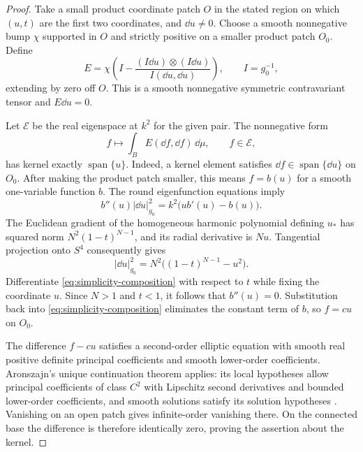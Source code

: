 \begin{proof}
Take a small product coordinate patch $O$ in the stated region on
which $(u,t)$ are the first two coordinates, and $\dd u\ne0$.
Choose a smooth nonnegative bump $\chi$ supported in $O$ and
strictly positive on a smaller product patch $O_0$. Define
\[
 E=\chi\left(I-
 \frac{(I\dd u)\otimes(I\dd u)}{I(\dd u,\dd u)}\right),
 \qquad I=g_0^{-1},
\]
extending by zero off $O$. This is a smooth nonnegative symmetric
contravariant tensor and $E\dd u=0$.

Let $\mathcal E$ be the real eigenspace at $k^2$ for the given
pair. The nonnegative form
\[
 f\longmapsto\int_B E(\dd f,\dd f)\,\dd\mu,
 \qquad f\in\mathcal E,
\]
has kernel exactly $\operatorname{span}\{u\}$. Indeed, a kernel
element satisfies $\dd f\in\operatorname{span}\{\dd u\}$ on
$O_0$. After making the product patch smaller, this means
$f=b(u)$ for a smooth one-variable function $b$. The round
eigenfunction equations imply
\begin{equation}\label{eq:simplicity-composition}
 b''(u)|\dd u|_{g_0}^2=k^2\bigl(ub'(u)-b(u)\bigr).
\end{equation}
The Euclidean gradient of the homogeneous harmonic polynomial
defining $u_*$ has squared norm $N^2(1-t)^{N-1}$, and its radial
derivative is $Nu$. Tangential projection onto $S^4$ consequently
gives
\[
 |\dd u|_{g_0}^2=N^2\bigl((1-t)^{N-1}-u^2\bigr).
\]
Differentiate \eqref{eq:simplicity-composition} with respect to $t$
while fixing the coordinate $u$. Since $N>1$ and $t<1$, it follows
that $b''(u)=0$. Substitution back into
\eqref{eq:simplicity-composition} eliminates the constant term of
$b$, so $f=cu$ on $O_0$.

The difference $f-cu$ satisfies a second-order elliptic equation
with smooth real positive definite principal coefficients and
smooth lower-order coefficients. Aronszajn's unique continuation
theorem applies: its local hypotheses allow principal coefficients
of class $C^2$ with Lipschitz second derivatives and bounded
lower-order coefficients, and smooth solutions satisfy its
solution hypotheses \cite[pp.~235--236]{Aronszajn1957}. Vanishing
on an open patch gives infinite-order vanishing there. On the
connected base the difference is therefore identically zero,
proving the assertion about the kernel.


\end{proof}
